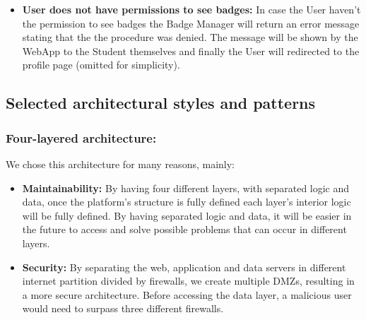 \documentclass{article}
\begin{document}
{\begin{itemize}
            haven't the permission to see tournaments' result the Tournament Manager 
            will return an error message stating that the the procedure was denied. 
            The message will be shown by the WebApp to the Student themselves and finally the User will 
            redirected to the profile page (omitted for simplicity).
            \item \textbf{User does not have permissions to see badges:} In case the User
            haven't the permission to see badges the Badge Manager 
            will return an error message stating that the the procedure was denied. 
            The message will be shown by the WebApp to the Student themselves and finally the User will 
            redirected to the profile page (omitted for simplicity).
        \end{itemize}


\subsection{Selected architectural styles and patterns}
    \subsubsection{Four-layered architecture:} We chose this architecture for many reasons, mainly:
    \begin{itemize}
        \item \textbf{Maintainability:} By having four different layers, with separated logic and data, once the platform's structure is fully defined
        each layer's interior logic will be fully defined.
        By having separated logic and data, it will be easier in the future to access and solve possible problems that can occur in different 
        layers.
        \item \textbf{Security:} By separating the web, application and data servers in different internet partition divided by firewalls, we create multiple
        DMZs, resulting in a more secure architecture. Before accessing the data layer, a malicious user would need to surpass three different firewalls. 
    \end{itemize}
}
\end{document}
